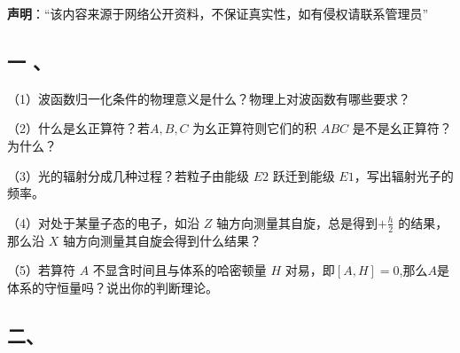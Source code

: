 
\textbf{声明}：“该内容来源于网络公开资料，不保证真实性，如有侵权请联系管理员”

\subsection{一 、}

（1）波函数归一化条件的物理意义是什么？物理上对波函数有哪些要求？

（2）什么是幺正算符？若$ A,B,C$ 为幺正算符则它们的积 $ABC$ 是不是幺正算符？为什么？

（3）光的辐射分成几种过程？若粒子由能级 $E2$ 跃迁到能级 $E1$，写出辐射光子的频率。

（4）对处于某量子态的电子，如沿 $Z$ 轴方向测量其自旋，总是得到$+\frac{h}{2}$
 的结果，那么沿 $X$ 轴方向测量其自旋会得到什么结果？

（5）若算符 $A$ 不显含时间且与体系的哈密顿量 $H$ 对易，即$[A,H]=0$,那么$A$是体系的守恒量吗？说出你的判断理论。
\subsection{二、}
